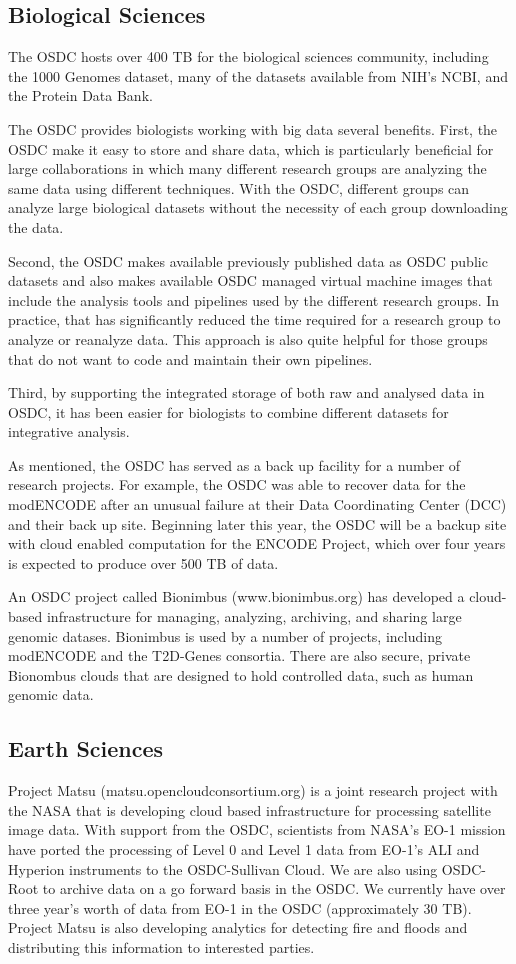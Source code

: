 \documentclass[11pt,twocolumn]{article}
\begin{document}
\subsection{Biological Sciences}  The OSDC hosts over 400 TB for the
biological sciences community, including the 1000 Genomes dataset,
many of the datasets available from NIH's NCBI, and the Protein Data
Bank.  

The OSDC provides biologists working with big data several
benefits.   First, the OSDC make it easy to store and share
data, which is particularly beneficial for large collaborations in
which many different research groups are analyzing the same data using
different techniques. With the OSDC, different groups can analyze large
biological datasets without the necessity of each group downloading
the data.

Second, the OSDC makes available previously published data as OSDC
public datasets and also makes available OSDC managed virtual machine
images that include the analysis tools and pipelines used by the
different research groups.  In practice, that has significantly reduced
the time required for a research group to analyze or reanalyze data.
This approach is also quite helpful for those groups that do not want
to code and maintain their own pipelines.

Third, by supporting the integrated storage of both raw and analysed
data in OSDC, it has been easier for biologists to combine different
datasets for integrative analysis.

As mentioned, the OSDC has served as a back up facility for a number
of research projects.  For example, the OSDC was able to recover data
for the modENCODE after an unusual failure at their Data Coordinating
Center (DCC) and their back up site. Beginning later this year, the
OSDC will be a backup site with cloud enabled computation for the
ENCODE Project, which over four years is expected to produce over 500
TB of data.

An OSDC project called Bionimbus (www.bionimbus.org) has developed a
cloud-based infrastructure for managing, analyzing, archiving, and
sharing large genomic datases.  Bionimbus is used by a number of
projects, including modENCODE and the T2D-Genes consortia.  There are
also secure, private Bionombus clouds that are designed to hold
controlled data, such as human genomic data.


\subsection{Earth Sciences}  Project Matsu (matsu.opencloudconsortium.org) is
a joint research project with the NASA that is developing cloud based
infrastructure for processing satellite image data.  With support from
the OSDC, scientists from NASA's EO-1 mission have ported the
processing of Level 0 and Level 1 data from EO-1's ALI and Hyperion
instruments to the OSDC-Sullivan Cloud.  We are also using OSDC-Root
to archive data on a go forward basis in the OSDC.  We currently have
over three year’s worth of data from EO-1 in the OSDC (approximately
30 TB).  Project Matsu is also developing analytics for detecting fire
and floods and distributing this information to interested parties.
\end{document}
